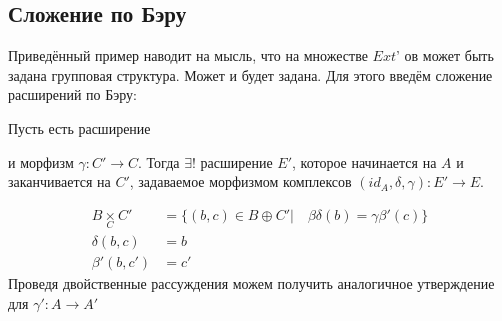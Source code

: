 \documentclass[../main.tex]{subfiles}
\begin{document}
\subsection{Сложение по Бэру}
Приведённый пример наводит на мысль, что на множестве $Ext$' ов может быть задана групповая структура. Может и будет задана. Для этого введём сложение расширений по Бэру:
\begin{to_claim}
Пусть есть расширение  и морфизм $\gamma\colon C' \rightarrow C$. Тогда $\exists ! $ расширение $E'$, которое начинается на $A$ и заканчивается на $C'$, задаваемое морфизмом комплексов $(id_{A}, \delta, \gamma): E' \rightarrow E$.
\bee
{}
\eee
\begin{align*}
    B \underset{C}{\times} C' &= \{ (b, c)\in B\oplus C' |\quad \beta\delta (b) = \gamma\beta' (c)\}\\
    \delta(b, c) &= b\\
    \beta'(b, c') &= c'
\end{align*}
Проведя двойственные рассуждения можем получить аналогичное утверждение для $\gamma'\colon A \rightarrow A'$\\
\bee
{}
\eee
\end{to_claim}
\end{document}
